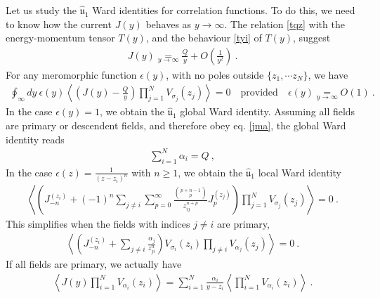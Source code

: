 \documentclass[12pt,a4paper,notitlepage]{report}
\numberwithin{equation}{section}
\theoremstyle{break}
\begin{document}
Let us study the $\hat{\mathfrak{u}}_1$ Ward identities for correlation functions.
To do this, we need to know how the current $J(y)$ behaves as $y\rightarrow \infty$.
The relation \eqref{tqz} with the energy-momentum tensor $T(y)$, and the behaviour \eqref{tyi} of $T(y)$, suggest
\begin{align}
 \boxed{J(y) \underset{y\rightarrow \infty}{=} \frac{Q}{y} + O\left(\frac{1}{y^2}\right)}\ .
\label{jyi}
\end{align}
For any meromorphic function $\epsilon(y)$, with no poles outside $\{z_1,\cdots z_N\}$, we have 
\begin{align}
 \oint_\infty dy\ \epsilon(y) \left\langle \left(J(y)-\frac{Q}{y}\right)\prod_{j=1}^N V_{\sigma_j}(z_j)\right\rangle = 0   \quad \text{provided} \quad \epsilon(y) \underset{y\rightarrow\infty}{=} O(1)\ .
\end{align}
In the case $\epsilon(y)=1$, we obtain the $\hat{\mathfrak{u}}_1$ global Ward identity.
Assuming all fields are primary or descendent fields, and therefore obey eq. \eqref{jma}, the global Ward identity reads
\begin{align}
 \boxed{\sum_{i=1}^N \alpha_i = Q} \ ,
\label{saq}
\end{align}
In the case $\epsilon(z) = \frac{1}{(z-z_i)^{n}}$ with $n\geq 1$, we obtain the $\hat{\mathfrak{u}}_1$ local Ward identity
\begin{align}
\left\langle \left(J_{-n}^{(z_i)}+ (-1)^{n}\sum_{j\neq i}\sum_{p=0}^\infty \frac{\binom{p+n-1}{p}}{z_{ij}^{n+p}}  J_p^{(z_j)}\right)\prod_{j=1}^N V_{\sigma_j}(z_j) \right\rangle = 0\ .
\label{jnjp}
\end{align}
This simplifies when the fields with indices $j\neq i$ are primary, 
\begin{align}
 \left\langle \left(J_{-n}^{(z_i)}  + \sum_{j\neq i} \frac{\alpha_j}{z_{ji}^n}\right) V_{\sigma_i}(z_i)\prod_{j\neq i} V_{\alpha_j}(z_j)\right\rangle= 0\ .
\label{jnz}
\end{align}
If all fields are primary, we actually have 
\begin{align}
 \boxed{\left\langle J(y) \prod_{i=1}^N V_{\alpha_i}(z_i) \right\rangle = \sum_{i=1}^N \frac{\alpha_i}{y-z_i} \left\langle \prod_{i=1}^N V_{\alpha_i}(z_i) \right\rangle  }\ .
\label{jsa}
\end{align}
\end{document}
